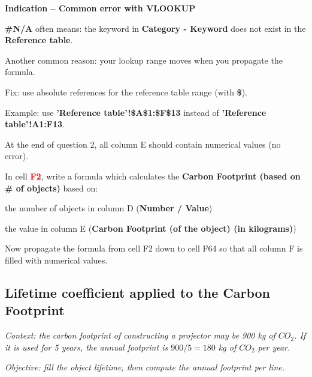\documentclass{exam}
\begin{document}
\begin{questions}
\begin{compactitem}
  \begin{Indication}
  \textbf{Indication -- Common error with VLOOKUP}
  \begin{compactitem}
    \item \textbf{\#N/A} often means: the keyword in \textbf{Category - Keyword} does not exist in the \textbf{Reference table}.
    \item Another common reason: your lookup range moves when you propagate the formula.
    \item Fix: use absolute references for the reference table range (with \textbf{\$}).
    \item Example: use \textbf{'Reference table'!\$A\$1:\$F\$13} instead of \textbf{'Reference table'!A1:F13}.
  \end{compactitem}
  \end{Indication}

  \item At the end of question 2, all column E should contain numerical values (no error).
   \end{compactitem}

  \question In cell \textbf{\textcolor{red}{F2}}, write a formula which calculates the \textbf{Carbon Footprint (based on \# of objects)} based on:
  \begin{compactitem}
    \item the number of objects in column D (\textbf{Number / Value})
    \item the value in column E (\textbf{Carbon Footprint (of the object) (in kilograms)})
  \end{compactitem}

  \question Now propagate the formula from cell F2 down to cell F64 so that all column F is filled with numerical values.
\end{questions}

\subsection{Lifetime coefficient applied to the Carbon Footprint}

\textit{Context: the carbon footprint of constructing a projector may be 900 kg of $CO_2$. If it is used for 5 years, the annual footprint is $900/5 = 180$ kg of $CO_2$ per year.}

\textit{Objective: fill the object lifetime, then compute the annual footprint per line.}
\end{document}
